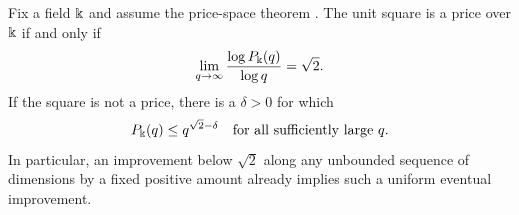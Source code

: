\begin{theorem}
\label{thm:square-pt-exponent}
Fix a field $\Bbbk$ and assume the price-space theorem
\cite[Proposition C.3]{Anthropic2026}.
The unit square is a price over $\Bbbk$ if and only if
\begin{equation}\label{eq:pt-sharp}
 \lim_{q\to\infty}\frac{\log P_\Bbbk(q)}{\log q}=\sqrt2.
\end{equation}
If the square is not a price, there is a $\delta>0$ for which
\begin{equation}\label{eq:pt-power-improvement}
 P_\Bbbk(q)\leq q^{\sqrt2-\delta}
 \quad\hbox{for all sufficiently large }q.
\end{equation}
In particular, an improvement below $\sqrt2$ along any unbounded
sequence of dimensions by a fixed positive amount already
implies such a uniform eventual improvement.
\end{theorem}
